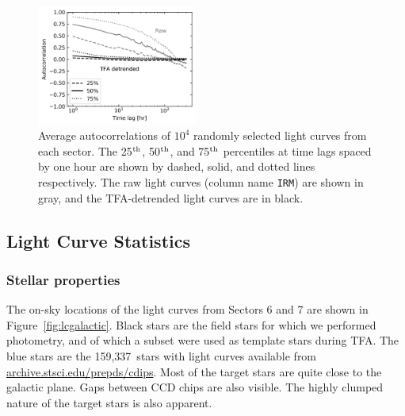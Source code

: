 \documentclass[12pt,twocolumn,tighten]{aastex62}
\newcommand{\numberlcs}{159{,}337\ } %
\newcommand{\stscilink}{\url{archive.stsci.edu/prepds/cdips}}
\begin{document}
\begin{figure}[!t]
	\begin{center}
		\leavevmode
		\includegraphics[width=0.47\textwidth]{avg_acf.png}
	\end{center}
	\vspace{-0.5cm}
  \caption{
    Average autocorrelations of $10^4$ randomly selected light curves
    from each sector. The 25$^{\rm th}$, 50$^{\rm th}$, and 75$^{\rm
    th}$ percentiles at time lags spaced by one hour are shown by
    dashed, solid, and dotted lines respectively.  The raw light
    curves (column name \texttt{IRM}) are shown in gray, and the
    TFA-detrended light curves are in black.
  \label{fig:avg_acf}
	}
\end{figure}


\subsection{Light Curve Statistics}
\label{subsec:lcstatistics}

\subsubsection{Stellar properties}

The on-sky locations of the light curves from Sectors 6 and 7
are shown in Figure~\ref{fig:lcgalactic}.
Black stars are the field stars for which we performed photometry,
and of which a subset were used as template stars during TFA.
The blue stars are the \numberlcs stars with light curves available
from \stscilink.
Most of the target stars are quite close to the galactic plane.
Gaps between CCD chips are also visible.
The highly clumped nature of the target stars is also apparent.

\end{document}
